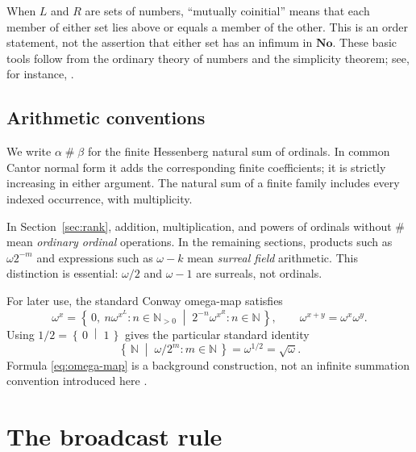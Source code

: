 \documentclass[11pt,letterpaper]{article}
\theoremstyle{definition}
\theoremstyle{remark}
\newcommand{\No}{\mathbf{No}}
\newcommand{\NN}{\mathbb N}
\newcommand{\ns}{\mathbin{\#}}
\newcommand{\cut}[2]{\left\{\,#1\;\middle|\;#2\,\right\}}
\begin{document}
When $L$ and $R$ are sets of numbers, ``mutually coinitial'' means that each
member of either set lies above or equals a member of the other. This is an
order statement, not the assertion that either set has an infimum in $\No$.
These basic tools follow from the ordinary theory of numbers and the simplicity
theorem; see, for instance, \cite[Sections~3--5]{schleicherstoll}.

\subsection{Arithmetic conventions}

We write $\alpha\ns\beta$ for the finite Hessenberg natural sum of ordinals.
In common Cantor normal form it adds the corresponding finite coefficients;
it is strictly increasing in either argument. The natural sum of a finite
family includes every indexed occurrence, with multiplicity.

In Section~\ref{sec:rank}, addition, multiplication, and powers of ordinals
without $\ns$ mean \emph{ordinary ordinal} operations. In the remaining sections, products such as $\omega 2^{-m}$ and
expressions such as $\omega-k$ mean \emph{surreal field} arithmetic.
This distinction is essential: $\omega/2$ and $\omega-1$ are surreals, not
ordinals.

For later use, the standard Conway omega-map satisfies
\begin{equation}\label{eq:omega-map}
 \omega^x=
 \cut{0,\ n\omega^{x^L}:n\in\NN_{>0}}
      {2^{-n}\omega^{x^R}:n\in\NN},
 \qquad \omega^{x+y}=\omega^x\omega^y.
\end{equation}
Using $1/2=\cut{0}{1}$ gives the particular standard identity
\begin{equation}\label{eq:sqrt-cut}
 \cut{\NN}{\omega/2^m:m\in\NN}=\omega^{1/2}=\sqrt{\omega}.
\end{equation}
Formula \eqref{eq:omega-map} is a background construction, not an infinite
summation convention introduced here \cite{conway,gonshor}.

\section{The broadcast rule}\label{sec:rule}
\end{document}
